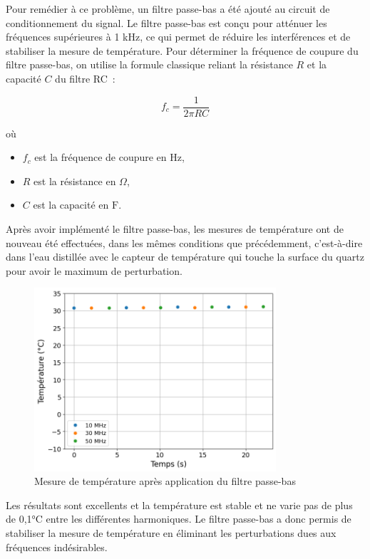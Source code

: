 Pour remédier à ce problème, un filtre passe-bas a été ajouté au circuit de conditionnement du signal.
Le filtre passe-bas est conçu pour atténuer les fréquences supérieures à 1 kHz, ce qui permet de réduire les interférences et de stabiliser la mesure de température.
\newpage
Pour déterminer la fréquence de coupure du filtre passe-bas, on utilise la formule classique reliant la résistance $R$ et la capacité $C$ du filtre RC :

\begin{equation}
f_c = \frac{1}{2\pi RC}
\label{eq:frequence_coupure}
\end{equation}

où
\begin{itemize}
    \item $f_c$ est la fréquence de coupure en Hz,
    \item $R$ est la résistance en $\Omega$,
    \item $C$ est la capacité en $\mathrm{F}$.
\end{itemize}

Après avoir implémenté le filtre passe-bas, les mesures de température ont de nouveau été effectuées, dans les mêmes conditions que précédemment, c'est-à-dire dans l'eau distillée avec le capteur de température qui touche la surface du quartz pour avoir le maximum de perturbation.

\begin{figure}[H]
    \centering
    \includegraphics[width=0.8\textwidth]{assets/figures/TempFiltered.png}
    \caption{Mesure de température après application du filtre passe-bas}
    \label{fig:TempBruitFiltre}
\end{figure}

Les résultats sont excellents et la température est stable et ne varie pas de plus de 0,1°C entre les différentes harmoniques.
Le filtre passe-bas a donc permis de stabiliser la mesure de température en éliminant les perturbations dues aux fréquences indésirables.
\newpage
